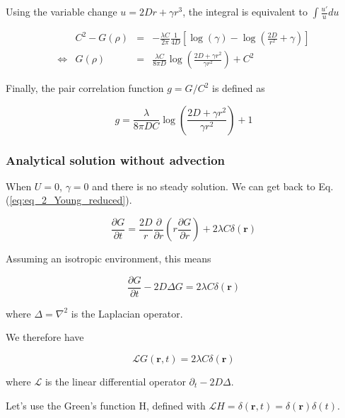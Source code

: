Using the variable change $u=2Dr+\gamma r^{3}$, the integral is equivalent
to $\int\frac{u'}{u}du$ 

\begin{align}
 & C^{2}-G(\rho) & = & -\frac{\lambda C}{2\pi}\frac{1}{4D}[\log(\gamma)-\log(\frac{2D}{r^{2}}+\gamma)]\label{eq:deriv_G_rint2}\\
\Leftrightarrow & G(\rho) & = & \frac{\lambda C}{8\pi D}\log\left(\frac{2D+\gamma r^{2}}{\gamma r^{2}}\right)+C^{2}\label{eq:G_rho}
\end{align}

Finally, the pair correlation function $g=G/C^{2}$ is defined as

\begin{equation}
g=\frac{\lambda}{8\pi DC}\log\left(\frac{2D+\gamma r^{2}}{\gamma r^{2}}\right)+1
\end{equation}


\subsubsection*{Analytical solution without advection}

When $U=0$, $\gamma=0$ and there is no steady solution. We can get
back to Eq. (\ref{eq:eq_2_Young_reduced}). 

\begin{equation}
\frac{\partial G}{\partial t}=\frac{2D}{r}\frac{\partial}{\partial r}\left(r\frac{\partial G}{\partial r}\right)+2\lambda C\delta(\boldsymbol{r})\label{eq:g_without_advection}
\end{equation}

Assuming an isotropic environment, this means

\begin{equation}
\frac{\partial G}{\partial t}-2D\Delta G=2\lambda C\delta(\boldsymbol{r})
\end{equation}

where $\Delta=\nabla^{2}$ is the Laplacian operator. 

We therefore have 

\begin{equation}
\mathcal{L}G(\boldsymbol{r},t)=2\lambda C\delta(\boldsymbol{r})\label{eq:LG_lambda}
\end{equation}

where $\mathcal{L}$ is the linear differential operator $\partial_{t}-2D\Delta$. 

Let's use the Green's function H, defined with $\mathcal{L}H=\delta(\boldsymbol{r},t)=\delta(\boldsymbol{r})\delta(t)$. 

